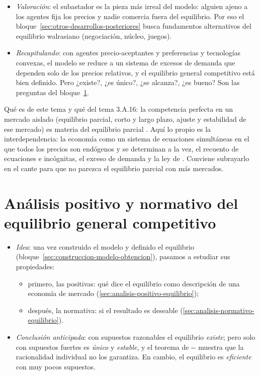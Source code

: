 \documentclass[11pt]{article}
\begin{document}
\begin{itemize}
\item \emph{Valoración}: el subastador es la pieza más irreal del modelo: alguien ajeno a los agentes fija los precios y nadie comercia fuera del equilibrio. Por eso el bloque~\ref{sec:otros-desarrollos-posteriores} busca fundamentos alternativos del equilibrio walrasiano (negociación, núcleo, juegos).
\item \emph{Recapitulando}: con agentes precio-aceptantes y preferencias y tecnologías convexas, el modelo se reduce a un sistema de excesos de demanda que dependen solo de los precios relativos, y el equilibrio general competitivo está bien definido. Pero ¿existe?, ¿es único?, ¿se alcanza?, ¿es bueno? Son las preguntas del bloque~\ref{sec:analisis-positivo-normativo}.
\end{itemize}

\begin{notaopositor}
Qué es de este tema y qué del tema 3.A.16: la competencia perfecta en un mercado aislado (equilibrio parcial, corto y largo plazo, ajuste y estabilidad de ese mercado) es materia del equilibrio parcial . Aquí lo propio es la interdependencia: la economía como un sistema de ecuaciones simultáneas en el que todos los precios son endógenos y se determinan a la vez, el recuento de ecuaciones e incógnitas, el exceso de demanda y la ley de . Conviene subrayarlo en el cante para que no parezca el equilibrio parcial con más mercados.
\end{notaopositor}


\section{Análisis positivo y normativo\cortetitulo{} del equilibrio general competitivo}\label{sec:analisis-positivo-normativo}

\begin{itemize}
\item \emph{Idea}: una vez construido el modelo y definido el equilibrio (bloque~\ref{sec:construccion-modelo-obtencion}), pasamos a estudiar sus propiedades:
  \begin{itemize}
  \item primero, las positivas: qué dice el equilibrio como descripción de una economía de mercado (\ref{sec:analisis-positivo-equilibrio});
  \item después, la normativa: si el resultado es deseable (\ref{sec:analisis-normativo-equilibrio}).
  \end{itemize}
\item \emph{Conclusión anticipada}: con supuestos razonables el equilibrio \emph{existe}; pero solo con supuestos fuertes es \emph{único} y \emph{estable}, y el teorema de -- muestra que la racionalidad individual no los garantiza. En cambio, el equilibrio es \emph{eficiente} con muy pocos supuestos.
\end{itemize}
\end{document}
